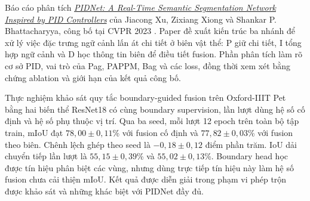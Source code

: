 Báo cáo phân tích \href{https://arxiv.org/abs/2206.02066}{\emph{PIDNet: A Real-Time Semantic Segmentation Network Inspired by PID Controllers}} của Jiacong Xu, Zixiang Xiong và Shankar P. Bhattacharyya, công bố tại CVPR 2023 \cite{pidnet}. Paper đề xuất kiến trúc ba nhánh để xử lý việc đặc trưng ngữ cảnh lấn át chi tiết ở biên vật thể: P giữ chi tiết, I tổng hợp ngữ cảnh và D học thông tin biên để điều tiết fusion. Phần phân tích làm rõ cơ sở PID, vai trò của Pag, PAPPM, Bag và các loss, đồng thời xem xét bằng chứng ablation và giới hạn của kết quả công bố.

Thực nghiệm khảo sát quy tắc boundary-guided fusion trên Oxford-IIIT Pet bằng hai biến thể ResNet18 có cùng boundary supervision, lần lượt dùng hệ số cố định và hệ số phụ thuộc vị trí. Qua ba seed, mỗi lượt 12 epoch trên toàn bộ tập train, mIoU đạt $78{,}00\pm0{,}11$\% với fusion cố định và $77{,}82\pm0{,}03$\% với fusion theo biên. Chênh lệch ghép theo seed là $-0{,}18\pm0{,}12$ điểm phần trăm. IoU dải chuyển tiếp lần lượt là $55{,}15\pm0{,}39$\% và $55{,}02\pm0{,}13$\%. Boundary head học được tín hiệu phân biệt các vùng, nhưng dùng trực tiếp tín hiệu này làm hệ số fusion chưa cải thiện mIoU. Kết quả được diễn giải trong phạm vi phép trộn được khảo sát và những khác biệt với PIDNet đầy đủ.
